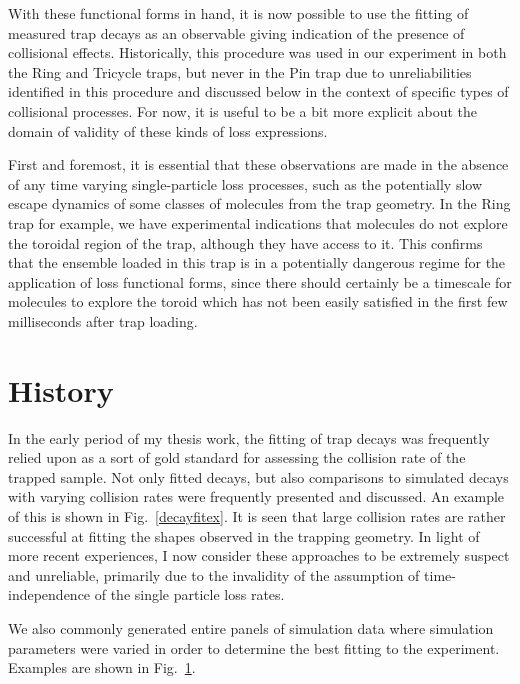 With these functional forms in hand, it is now possible to use the fitting of measured trap decays as an observable giving indication of the presence of collisional effects.
Historically, this procedure was used in our experiment in both the Ring and Tricycle traps, but never in the Pin trap due to unreliabilities identified in this procedure and discussed below in the context of specific types of collisional processes.
For now, it is useful to be a bit more explicit about the domain of validity of these kinds of loss expressions.

First and foremost, it is essential that these observations are made in the absence of any time varying single-particle loss processes, such as the potentially slow escape dynamics of some classes of molecules from the trap geometry.
In the Ring trap for example, we have experimental indications that molecules do not explore the toroidal region of the trap, although they have access to it.
This confirms that the ensemble loaded in this trap is in a potentially dangerous regime for the application of loss functional forms, since there should certainly be a timescale for molecules to explore the toroid which has not been easily satisfied in the first few milliseconds after trap loading.

\section{History}

In the early period of my thesis work, the fitting of trap decays was frequently relied upon as a sort of gold standard for assessing the collision rate of the trapped sample.
Not only fitted decays, but also comparisons to simulated decays with varying collision rates were frequently presented and discussed.
An example of this is shown in Fig.~\ref{decayfitex}.
It is seen that large collision rates are rather successful at fitting the shapes observed in the trapping geometry.
In light of more recent experiences, I now consider these approaches to be extremely suspect and unreliable, primarily due to the invalidity of the assumption of time-independence of the single particle loss rates.


We also commonly generated entire panels of simulation data where simulation parameters were varied in order to determine the best fitting to the experiment.
Examples are shown in Fig.~\ref{}.







\ifx\justbeingincluded\undefined

\fi